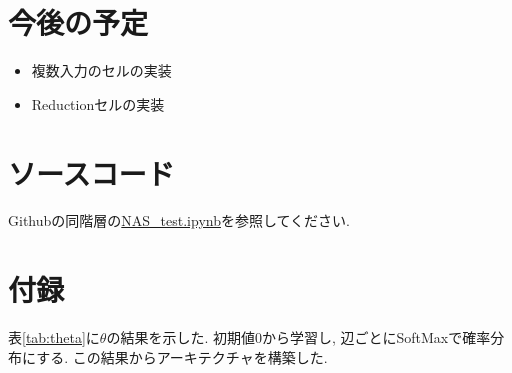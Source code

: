 \documentclass[twocolumn]{jarticle}     %
\begin{document}
\section{今後の予定}
\begin{itemize}
  \item 複数入力のセルの実装
  \item Reductionセルの実装
\end{itemize}


\section{ソースコード}
Githubの同階層の\url{NAS_test.ipynb}を参照してください.
%


\section{付録}
表\ref{tab:theta}に$\theta$の結果を示した.
初期値0から学習し, 辺ごとにSoftMaxで確率分布にする.
この結果からアーキテクチャを構築した.
\end{document}
